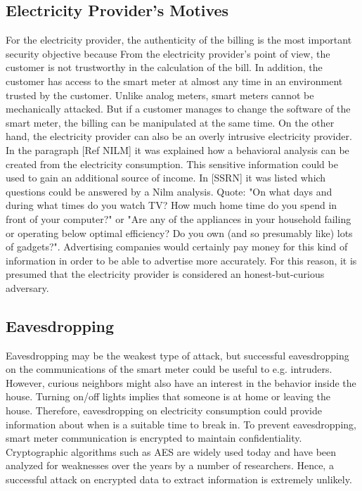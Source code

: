 \subsection{Electricity Provider's Motives}
For the electricity provider, the authenticity of the billing is the most important security objective because From the electricity provider's point of view, the customer is not trustworthy in the calculation of the bill. In addition, the customer has access to the smart meter at almost any time in an environment trusted by the customer. Unlike analog meters, smart meters cannot be mechanically attacked. But if a customer manages to change the software of the smart meter, the billing can be manipulated at the same time. On the other hand, the electricity provider can also be an overly intrusive electricity provider. In the paragraph [Ref NILM] it was explained how a behavioral analysis can be created from the electricity consumption. This sensitive information could be used to gain an additional source of income. In [SSRN] it was listed which questions could be answered by a Nilm analysis. Quote: "On what days and during what times do you watch TV? How much home time do you spend in front of your computer?" or "Are any of the appliances in your household failing or operating below optimal efficiency? Do you own (and so presumably like) lots of gadgets?". Advertising companies would certainly pay money for this kind of information in order to be able to advertise more accurately. For this reason, it is presumed that the electricity provider is considered an honest-but-curious adversary. 
\subsection{Eavesdropping}
Eavesdropping may be the weakest type of attack, but successful eavesdropping on the communications of the smart meter could be useful to e.g. intruders. However, curious neighbors might also have an interest in the behavior inside the house. Turning on/off lights implies that someone is at home or leaving the house. Therefore, eavesdropping on electricity consumption could provide information about when is a suitable time to break in. To prevent eavesdropping, smart meter communication is encrypted to maintain confidentiality. Cryptographic algorithms such as AES are widely used today and have been analyzed for weaknesses over the years by a number of researchers. Hence, a successful attack on encrypted data to extract information is extremely unlikely.
